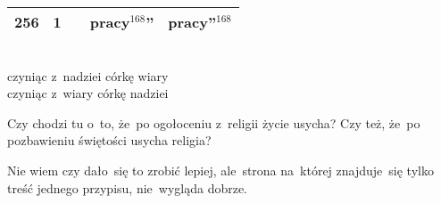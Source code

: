 \documentclass[a4paper,11pt]{article}
\begin{document}
\begin{center}
\begin{tabular}{|c|c|c|c|c|}
    256 &  1 & & pracy$^{ 168 }$'' & pracy''$^{ 168 }$ \\
    \hline
  \end{tabular}
\end{center}
\noindent
{} \\
\Jest  czyniąc z~nadziei córkę wiary \\
\Powin czyniąc z~wiary córkę nadziei \\

\vspace{\spaceTwo}










\start {} Czy chodzi tu o~to, że~po ogołoceniu z~religii
życie usycha? Czy też, że~po pozbawieniu świętości usycha religia?

\vspace{\spaceFour}


\start {} Nie wiem czy dało~się to zrobić lepiej, ale~strona
na~której znajduje~się tylko treść jednego przypisu, nie~wygląda
dobrze.
\end{document}
